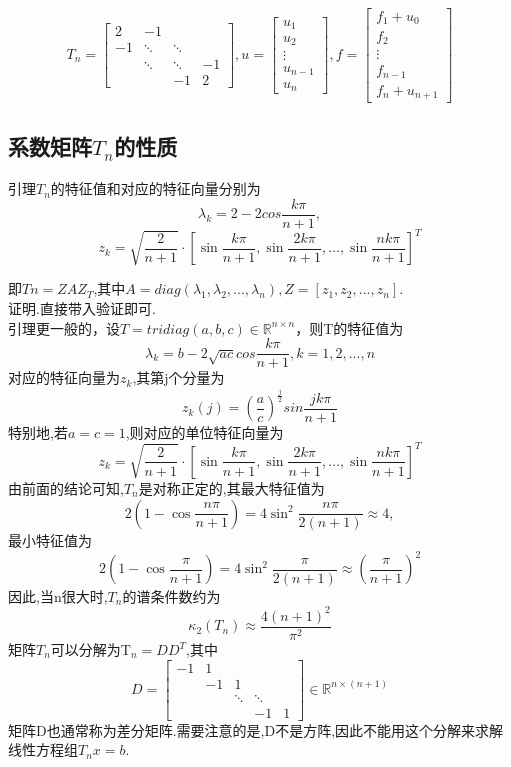 \documentclass[12pt,a4paper]{article}
\begin{document}
\begin{equation}
	T_{n}=\left[\begin{array}{cccc}{2} & {-1} & {} & {} \\ {-1} & {\ddots} & {\ddots} & {} \\ {} & {\ddots} & {\ddots} & {-1} \\ {} & {} & {-1} & {2}\end{array}\right], u=\left[\begin{array}{c}{u_{1}} \\ {u_{2}} \\ {\vdots} \\ {u_{n-1}} \\ {u_{n}}\end{array}\right], f=\left[\begin{array}{c}{f_{1}+u_{0}} \\ {f_{2}} \\ {\vdots} \\ {f_{n-1}} \\ {f_{n}+u_{n+1}}\end{array}\right]
\tag{6.3}
\end{equation}
\subsection*{ 系数矩阵$T_n$的性质}
{\color{blue}引理}\quad$T_n$的特征值和对应的特征向量分别为
$$
\lambda_k=2-2cos\frac{k\pi}{n+1},
$$
$$
z_{k}=\sqrt{\frac{2}{n+1}} \cdot\left[\sin \frac{k \pi}{n+1}, \sin \frac{2 k \pi}{n+1}, \ldots, \sin \frac{n k \pi}{n+1}\right]^{T}
$$

即$Tn=ZAZ_T$,其中$A=diag(\lambda_1,\lambda_2,...,\lambda_n),Z= [z_1,z_2,...,z_n].$\\
{\color{blue}证明}.直接带入验证即可.\\
{\color{blue}引理}\quad 更一般的，设$T=tridiag(a,b,c)\in \mathbb{R}^{n\times n}$，则T的特征值为
$$
\lambda_k=b-2\sqrt{ac}cos\frac{k\pi}{n+1},k=1,2,...,n
$$
对应的特征向量为$z_k$,其第j个分量为
$$
z_k(j)=(\frac{a}{c})^{\frac{j}{2}}sin\frac{jk\pi}{n+1}
$$
特别地,若$a=c=1$,则对应的单位特征向量为
$$
z_{k}=\sqrt{\frac{2}{n+1}} \cdot\left[\sin \frac{k \pi}{n+1}, \sin \frac{2 k \pi}{n+1}, \ldots, \sin \frac{n k \pi}{n+1}\right]^{T}
$$
由前面的结论可知,$T_n$是对称正定的,其最大特征值为
$$
2\left(1-\cos \frac{n \pi}{n+1}\right)=4 \sin ^{2} \frac{n \pi}{2(n+1)} \approx 4,
$$
最小特征值为
$$
2\left(1-\cos \frac{\pi}{n+1}\right)=4 \sin ^{2} \frac{\pi}{2(n+1)} \approx\left(\frac{\pi}{n+1}\right)^{2}
$$
因此,当n很大时,$T_n$的谱条件数约为
$$
\kappa_{2}\left(T_{n}\right) \approx \frac{4(n+1)^{2}}{\pi^{2}}
$$
矩阵$T_n$可以分解为T$_n=DD^T$,其中
$$
D=\left[\begin{array}{ccccc}{-1} & {1} & {} & {} & {} \\ {} & {-1} & {1} & {} \\ {} & {} & {\ddots} & {\ddots} \\ {} & {} & {} & {-1} & {1}\end{array}\right] \in \mathbb{R}^{n \times(n+1)}
$$
矩阵D也通常称为{\color{blue}差分矩阵}.需要注意的是,D不是方阵,因此不能用这个分解来求解线性方程组$T_nx=b.$
\end{document}

